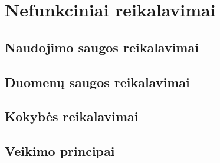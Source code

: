 \documentclass[oneside]{VUMIFPSkursinis}
\begin{document}
\section{Nefunkciniai reikalavimai}
\subsection{Naudojimo saugos reikalavimai}
\subsection{Duomenų saugos reikalavimai}
\subsection{Kokybės reikalavimai}
\subsection{Veikimo principai}
\end{document}
